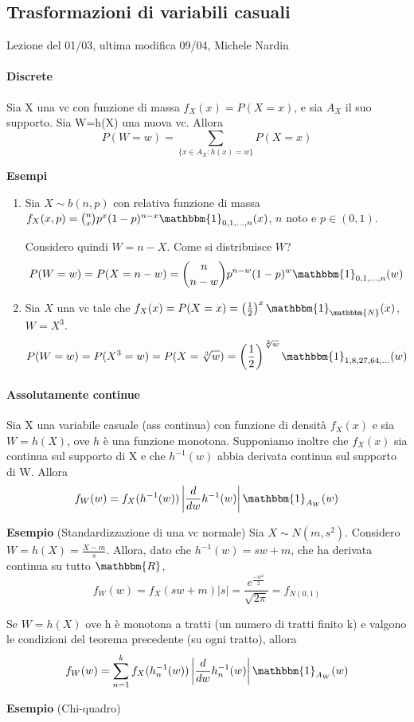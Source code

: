 
\subsection{Trasformazioni di variabili casuali}
Lezione del 01/03, ultima modifica 09/04, Michele Nardin
\paragraph{Discrete}
\begin{teo}
Sia X una vc con funzione di massa $f_X(x)=P(X=x)$, e sia $A_X$ il suo supporto. 
Sia W=h(X) una nuova vc. Allora $$P(W=w)=\sum_{\{x\in A_X:h(x)=w\}}P(X=x)$$
\end{teo}

\noindent \textbf{Esempi}
\begin{enumerate}

\item Sia $X \sim b(n,p)$ con relativa funzione di massa 
$f_X(x,p)=\binom{n}{x}p^x(1-p)^{n-x}\mathbbm{1}_{0,1,...,n}(x)$,
$n$ noto e $p\in(0,1)$.

Considero quindi $W=n-X$. Come si distribuisce $W$? 
$$P(W=w)=P(X=n-w)=\binom{n}{n-w}p^{n-w}(1-p)^w\mathbbm{1}_{0,1,...,n}(w)$$
\item Sia $X$ una vc tale che 
$f_X(x)=P(X=x)=\left(\frac{1}{2}\right)^x\mathbbm{1}_\mathbbm{N}(x)$, $W=X^3$. 
$$P(W=w)=P(X^3=w)=P(X=\sqrt[3]{w})=\left(\frac{1}{2}\right)^{\sqrt[3]{w}}\mathbbm{1}_{1,8,27,64,...}(w)$$
\end{enumerate}

\paragraph{Assolutamente continue}
\begin{teo}
Sia X una variabile casuale (ass continua) con funzione di densità $f_X(x)$ e sia $W=h(X)$, ove $h$ è una funzione monotona. 
Supponiamo inoltre che $f_X(x)$ sia continua sul supporto di X e che $h^{-1}(w)$ abbia derivata continua sul supporto di W. Allora
$$f_W(w)=f_X(h^{-1}(w))\left|\frac{d}{dw}h^{-1}(w)\right|\mathbbm{1}_{A_W}(w)$$
\end{teo}
\noindent \textbf{Esempio}
(Standardizzazione di una vc normale)
Sia $X \sim N(m,s^2)$. 
Considero $W=h(X)=\frac{X-m}{s}$. 
Allora, dato che $h^{-1}(w)=sw+m$, 
che ha derivata continua su tutto $\mathbbm{R}$,  
$$f_W(w)=f_X(sw+m)|s|=\frac{e^{\frac{-w^2 }{2}}}{\sqrt{2\pi}} = f_{N(0,1)}$$
\begin{teo}
Se $W=h(X)$ ove h è monotona a tratti (un numero di tratti finito k) e valgono le condizioni del teorema precedente (su ogni tratto), allora
$$f_W(w)=\sum_{n=1}^k f_X(h_n^{-1}(w))\left|\frac{d}{dw}h_n^{-1}(w)\right|\mathbbm{1}_{A_W}(w)$$
\end{teo}
\noindent \textbf{Esempio} (Chi-quadro)


